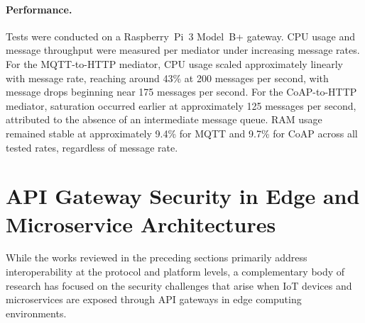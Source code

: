 \paragraph{Performance.}
Tests were conducted on a Raspberry~Pi~3 Model~B+ gateway. CPU usage and message throughput were measured per mediator under increasing message rates. For the MQTT-to-HTTP mediator, CPU usage scaled approximately linearly with message rate, reaching around 43\% at 200 messages per second, with message drops beginning near 175 messages per second. For the CoAP-to-HTTP mediator, saturation occurred earlier at approximately 125 messages per second, attributed to the absence of an intermediate message queue. RAM usage remained stable at approximately 9.4\% for MQTT and 9.7\% for CoAP across all tested rates, regardless of message rate.

\section{API Gateway Security in Edge and Microservice Architectures}
\label{sec:soa_api_gateway_security}

While the works reviewed in the preceding sections primarily address interoperability at the protocol and platform levels, a complementary body of research has focused on the security challenges that arise when IoT devices and microservices are exposed through API gateways in edge computing environments.

